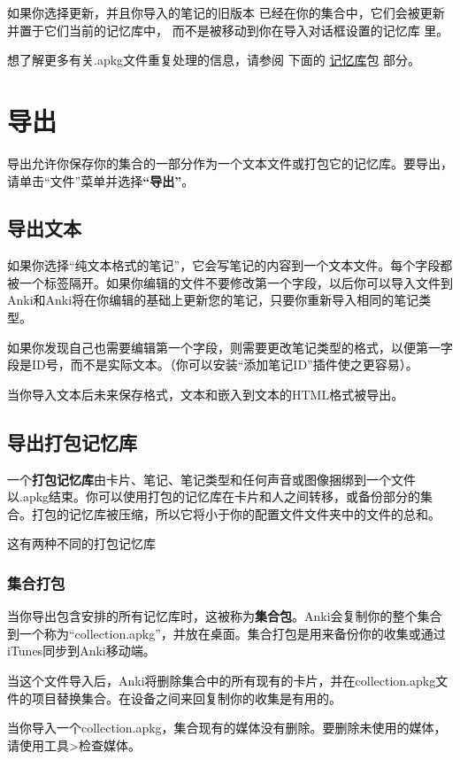 \documentclass[a4paper]{book}
\begin{document}
		如果你选择更新，并且你导入的笔记的旧版本 已经在你的集合中，它们会被更新并置于它们当前的记忆库中， 而不是被移动到你在导入对话框设置的记忆库 里。
		
		想了解更多有关.apkg文件重复处理的信息，请参阅 下面的
		\hyperref[apkg-export]{记忆库}包 部分。
		
		\chapter{导出}\label{exporting}
		
		导出允许你保存你的集合的一部分作为一个文本文件或打包它的记忆库。要导出，请单击“文件”菜单并选择\textbf{“导出”}。
		\section{导出文本}
		
		如果你选择“纯文本格式的笔记”，它会写笔记的内容到一个文本文件。每个字段都被一个标签隔开。如果你编辑的文件不要修改第一个字段，以后你可以导入文件到Anki和Anki将在你编辑的基础上更新您的笔记，只要你重新导入相同的笔记类型。
		
		如果你发现自己也需要编辑第一个字段，则需要更改笔记类型的格式，以便第一字段是ID号，而不是实际文本。（你可以安装“添加笔记ID”插件使之更容易）。
		
		当你导入文本后未来保存格式，文本和嵌入到文本的HTML格式被导出。
		\section{导出打包记忆库}
		
		一个\textbf{打包记忆库}由卡片、笔记、笔记类型和任何声音或图像捆绑到一个文件以.apkg结束。你可以使用打包的记忆库在卡片和人之间转移，或备份部分的集合。打包的记忆库被压缩，所以它将小于你的配置文件文件夹中的文件的总和。
		
		这有两种不同的打包记忆库
		
		\subsection{集合打包}
		当你导出包含安排的所有记忆库时，这被称为\textbf{集合包}。Anki会复制你的整个集合到一个称为“collection.apkg”，并放在桌面。集合打包是用来备份你的收集或通过iTunes同步到Anki移动端。
		
		当这个文件导入后，Anki将删除集合中的所有现有的卡片，并在collection.apkg文件的项目替换集合。在设备之间来回复制你的收集是有用的。
		
		
		\begin{shaded}
			当你导入一个collection.apkg，集合现有的媒体没有删除。要删除未使用的媒体，请使用工具>检查媒体。
		\end{shaded}
		
\end{document}
